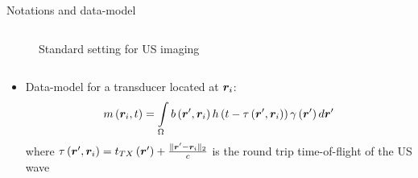 {\begin{block}{Notations and data-model}
\begin{columns}
		\begin{column}{.43\textwidth} %
			\centering
			\begin{figure}
				{\footnotesize
					}
				\caption{Standard setting for US imaging}
			\end{figure}
		\end{column}
	\end{columns} %
	
	\begin{itemize}
		\item Data-model for a transducer located at $\bm{r}_i$:
		\begin{equation}
			m \left(\bm{r}_i, t\right) = \int \limits_{\Omega} b \left(\bm{r}', \bm{r}_i\right) h \left(t - \tau \left(\bm{r}', \bm{r}_i\right)\right) \gamma \left(\bm{r}'\right) d \bm{r}'
		\end{equation}
		where $\tau \left(\bm{r}', \bm{r}_i\right) = t_{TX} \left(\bm{r}'\right) + \frac{\| \bm{r}' - \bm{r}_i \|_2}{c}$ is the round trip time-of-flight of the US wave 
	\end{itemize}
	
\end{block}
\vfill 


}
